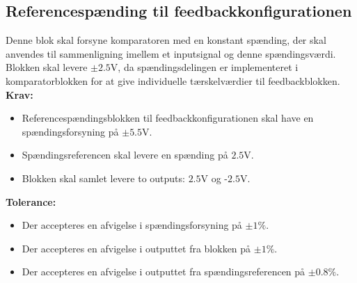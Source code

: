 \subsection{Referencespænding til feedbackkonfigurationen}\label{Ref_Kompar_Afs}
Denne blok skal forsyne komparatoren med en konstant spænding, der skal anvendes til sammenligning imellem et inputsignal og denne spændingsværdi.
Blokken skal levere $\pm2.5$V, da spændingsdelingen er implementeret i komparatorblokken for at give individuelle tærskelværdier til feedbackblokken. \\ 
\noindent\textbf{Krav:}
\begin{itemize}
	\item Referencespændingsblokken til feedbackkonfigurationen skal have en spændingsforsyning på $\pm5.5$V.
	\item Spændingsreferencen skal levere en spænding på $2.5$V.
	\item Blokken skal samlet levere to outputs: $2.5$V og -$2.5$V.
\end{itemize}
\noindent \textbf{Tolerance:}
\begin{itemize}
	\item Der accepteres en afvigelse i spændingsforsyning på $\pm1\%$.
	\item Der accepteres en afvigelse i outputtet fra blokken på $\pm1\%$.
	\item Der accepteres en afvigelse i outputtet fra spændingsreferencen på $\pm0.8\%$. 
\end{itemize}
